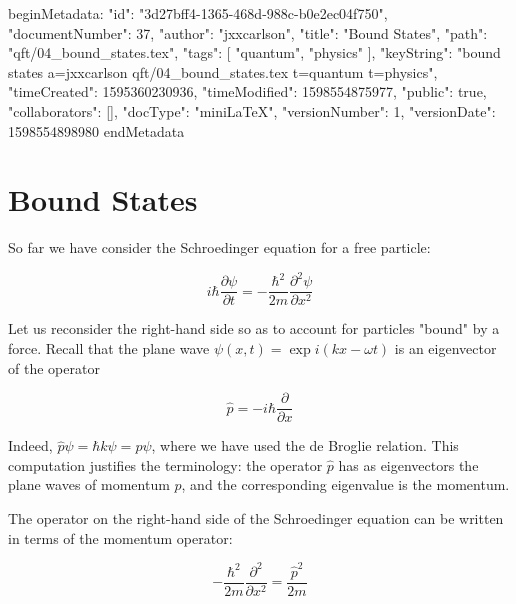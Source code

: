 beginMetadata:
{
    "id": "3d27bff4-1365-468d-988c-b0e2ec04f750",
    "documentNumber": 37,
    "author": "jxxcarlson",
    "title": "Bound States",
    "path": "qft/04_bound_states.tex",
    "tags": [
        "quantum",
        "physics"
    ],
    "keyString": "bound states a=jxxcarlson qft/04_bound_states.tex t=quantum t=physics",
    "timeCreated": 1595360230936,
    "timeModified": 1598554875977,
    "public": true,
    "collaborators": [],
    "docType": "miniLaTeX",
    "versionNumber": 1,
    "versionDate": 1598554898980
}
endMetadata
\begin{mathmacro}
\newcommand{\bop}[0]{\bf{p}}
\newcommand{\boF}[0]{\bf{F}}
\newcommand{\bor}[0]{\bf{r}}
\newcommand{\bov}[0]{\bf{v}}
\end{mathmacro}

\setcounter{section}{4}


\section{Bound States}


So far we have consider the Schroedinger equation for a free particle:

\begin{equation}
  i\hbar \frac{\partial \psi}{\partial t} 
    =
  -\frac{ \hbar^2 }{2m}\frac{ \partial^2 \psi}{ \partial x^2 }
\end{equation}

Let us reconsider the right-hand side so as to account for particles "bound" by a force.  Recall that the plane wave $\psi(x,t) = \exp i(kx - \omega t)$  is an eigenvector of the operator

\begin{equation}
  \hat p = -i\hbar \frac{\partial}{\partial x}
\end{equation}

Indeed, $\hat p \psi = \hbar  k\psi = p\psi$, where we have used the de Broglie relation.  This computation justifies the terminology: the operator $\hat p$ has as eigenvectors the plane waves of momentum $p$, and the corresponding eigenvalue is the momentum.


The operator on the right-hand side of the Schroedinger equation can be written in terms of the momentum operator:

\begin{equation}
    -\frac{ \hbar^2 }{2m}\frac{ \partial^2 }{ \partial x^2 }
 = \frac{\hat p^2}{2m}
\end{equation}

